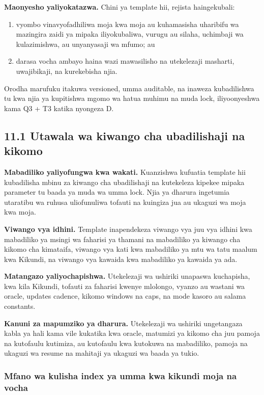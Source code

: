 \documentclass[11pt]{article}
\begin{document}
\textbf{Maonyesho yaliyokatazwa.} Chini ya template hii, rejista haingekubali:

\begin{enumerate}[leftmargin=*]
\item vyombo vinavyofadhiliwa moja kwa moja au kuhamasisha uharibifu wa mazingira zaidi ya mipaka iliyokubaliwa, vurugu au silaha, uchimbaji wa kulazimishwa, au unyanyasaji wa mfumo; au
\item darasa vocha ambayo haina wazi mawasilisho na utekelezaji masharti, uwajibikaji, na kurekebisha njia.
\end{enumerate}
Orodha marufuku itakuwa versioned, umma auditable, na inaweza kubadilishwa tu kwa njia ya kupitishwa mgomo wa hatua muhimu na muda lock, iliyoonyeshwa kama Q3 + T3 katika nyongeza D.

\subsection*{11.1 Utawala wa kiwango cha ubadilishaji na kikomo}

\textbf{Mabadiliko yaliyofungwa kwa wakati.} Kuanzishwa kufuatia template hii kubadilisha mbinu za kiwango cha ubadilishaji na kutekeleza kipekee mipaka parameter tu baada ya muda wa umma lock. Njia ya dharura ingetumia utaratibu wa ruhusa uliofunuliwa tofauti na kuingiza jua au ukaguzi wa moja kwa moja.

\textbf{Viwango vya idhini.} Template inapendekeza viwango vya juu vya idhini kwa mabadiliko ya msingi wa faharisi ya thamani na mabadiliko ya kiwango cha kikomo cha kimataifa, viwango vya kati kwa mabadiliko ya mtu wa tatu maalum kwa Kikundi, na viwango vya kawaida kwa mabadiliko ya kawaida ya ada.

\textbf{Matangazo yaliyochapishwa.} Utekelezaji wa ushiriki unapaswa kuchapisha, kwa kila Kikundi, tofauti za faharisi kwenye mlolongo, vyanzo au wastani wa oracle, updates cadence, kikomo windows na caps, na mode kasoro au salama constants.

\textbf{Kanuni za mapumziko ya dharura.} Utekelezaji wa ushiriki ungetangaza kabla ya hali kama vile kukatika kwa oracle, matumizi ya kikomo cha juu pamoja na kutofaulu kutimiza, au kutofaulu kwa kutokuwa na mabadiliko, pamoja na ukaguzi wa resume na mahitaji ya ukaguzi wa baada ya tukio.

\subsubsection*{Mfano wa kulisha index ya umma kwa kikundi moja na vocha}
\end{document}
